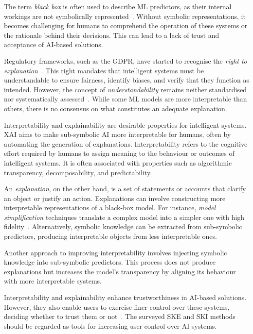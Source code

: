 The term \emph{black box} is often used to describe \gls{ML} predictors, as their internal workings are not symbolically represented~\cite{interpretability-lipton-2018}.
%
Without symbolic representations, it becomes challenging for humans to comprehend the operation of these systems or the rationale behind their decisions.
%
This can lead to a lack of trust and acceptance of \gls{AI}-based solutions.


Regulatory frameworks, such as the \gls{GDPR}, have started to recognise the \emph{right to explanation}~\cite{DBLP:journals/aim/GoodmanF17}.
%
This right mandates that intelligent systems must be understandable to ensure fairness, identify biases, and verify that they function as intended.
%
However, the concept of \emph{understandability} remains neither standardised nor systematically assessed~\cite{DBLP:journals/ai/Miller19}.
%
While some \gls{ML} models are more interpretable than others, there is no consensus on what constitutes an adequate explanation.


Interpretability and explainability are desirable properties for intelligent systems.
%
\Gls{XAI} aims to make sub-symbolic \gls{AI} more interpretable for humans, often by automating the generation of explanations.
%
Interpretability refers to the cognitive effort required by humans to assign meaning to the behaviour or outcomes of intelligent systems.
%
It is often associated with properties such as algorithmic transparency, decomposability, and predictability.


An \emph{explanation}, on the other hand, is a set of statements or accounts that clarify an object or justify an action.
%
Explanations can involve constructing more interpretable representations of a black-box model.
%
For instance, \emph{model simplification} techniques translate a complex model into a simpler one with high fidelity~\cite{DBLP:conf/kdd/TolomeiSHL17,DBLP:journals/csur/GuidottiMRTGP19}.
%
Alternatively, symbolic knowledge can be extracted from sub-symbolic predictors, producing interpretable objects from less interpretable ones.


Another approach to improving interpretability involves injecting symbolic knowledge into sub-symbolic predictors.
%
This process does not produce explanations but increases the model's transparency by aligning its behaviour with more interpretable systems.

Interpretability and explainability enhance trustworthiness in \gls{AI}-based solutions.
%
However, they also enable users to exercise finer control over these systems, deciding whether to trust them or not~\cite{10.1214/21-SS133}.
%
The surveyed \gls{SKE} and \gls{SKI} methods should be regarded as tools for increasing user control over \gls{AI} systems.


